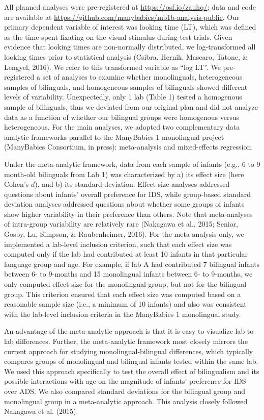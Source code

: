 \documentclass[english,,man,floatsintext]{apa6}
\begin{document}
All planned analyses were pre-registered at \url{https://osf.io/zauhq/}; data and code are available at \url{https://github.com/manybabies/mb1b-analysis-public}. Our primary dependent variable of interest was looking time (LT), which was defined as the time spent fixating on the visual stimulus during test trials. Given evidence that looking times are non-normally distributed, we log-transformed all looking times prior to statistical analysis (Csibra, Hernik, Mascaro, Tatone, \& Lengyel, 2016). We refer to this transformed variable as \enquote{log LT}. We pre-registered a set of analyses to examine whether monolinguals, heterogeneous samples of bilinguals, and homogeneous samples of bilinguals showed different levels of variability. Unexpectedly, only 1 lab (Table 1) tested a homogenous sample of bilinguals, thus we deviated from our original plan and did not analyze data as a function of whether our bilingual groups were homogenous versus heterogeneous. For the main analyses, we adopted two complementary data analytic frameworks parallel to the ManyBabies 1 monolingual project (ManyBabies Consortium, in press): meta-analysis and mixed-effects regression.

Under the meta-analytic framework, data from each sample of infants (e.g., 6 to 9 month-old bilinguals from Lab 1) was characterized by a) its effect size (here Cohen's \(d\)), and b) its standard deviation. Effect size analyses addressed questions about infants' overall preference for IDS, while group-based standard deviation analyses addressed questions about whether some groups of infants show higher variability in their preference than others. Note that meta-analyses of intra-group variability are relatively rare (Nakagawa et al., 2015; Senior, Gosby, Lu, Simpson, \& Raubenheimer, 2016). For the meta-analysis only, we implemented a lab-level inclusion criterion, such that each effect size was computed only if the lab had contributed at least 10 infants in that particular language group and age. For example, if lab A had contributed 7 bilingual infants between 6- to 9-months and 15 monolingual infants between 6- to 9-months, we only computed effect size for the monolingual group, but not for the bilingual group. This criterion ensured that each effect size was computed based on a reasonable sample size (i.e., a minimum of 10 infants) and also was consistent with the lab-level inclusion criteria in the ManyBabies 1 monolingual study.

An advantage of the meta-analytic approach is that it is easy to visualize lab-to-lab differences. Further, the meta-analytic framework most closely mirrors the current approach for studying monolingual-bilingual differences, which typically compares groups of monolingual and bilingual infants tested within the same lab. We used this approach specifically to test the overall effect of bilingualism and its possible interactions with age on the magnitude of infants' preference for IDS over ADS. We also compared standard deviations for the bilingual group and monolingual group in a meta-analytic approach. This analysis closely followed Nakagawa et al. (2015).
\end{document}
